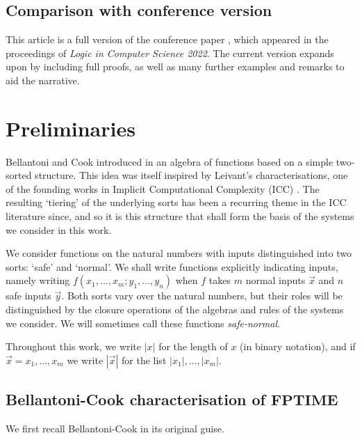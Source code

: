 \documentclass[manuscript,screen]{acmart}
\theoremstyle{definition}
\theoremstyle{remark}
\newcommand{\ptime}{\mathbf{PTIME}}
\newcommand{\f}{\mathbf{F}}
\newcommand{\fptime}{\f\ptime}
\begin{document}
\subsection*{Comparison with conference version}
This article is a full version of the conference paper \cite{CurziDas:lics22}, which appeared in the proceedings of \emph{Logic in Computer Science 2022}. 
The current version expands upon \cite{CurziDas:lics22} by including full proofs, as well as many further examples and remarks to aid the narrative.\section{Preliminaries}\label{sec:preliminaries}

Bellantoni and Cook introduced in \cite{BellantoniCook} an algebra of functions based on a simple two-sorted structure. This idea was itself inspired by Leivant's characterisations, one of the founding works in Implicit Computational Complexity (ICC) \cite{Leivant91}.
The resulting `tiering' of the underlying sorts has been a recurring theme in the ICC literature since, and so it is this structure that shall form the basis of the systems we consider in this work.

We consider functions on the natural numbers with inputs distinguished into two sorts: `safe' and `normal'.
We shall write functions explicitly indicating inputs, namely writing $f(x_1, \dots, x_{m}; y_1, \dots, y_{n})$ when $f$ takes $m$ normal inputs $\vec x$ and $n$ safe inputs $\vec y$.
Both sorts vary over the natural numbers, but their roles will be distinguished by the closure operations of the algebras and rules of the systems we consider. We will sometimes call these functions \emph{safe-normal}.

Throughout this work, we write $|x|$ for the length of $x$ (in binary notation), and if $\vec x = x_1, \dots, x_m$ we write $|\vec x|$ for the list $|x_1|,\dots, |x_m|$.


\subsection{Bellantoni-Cook characterisation of $\fptime$}
We first recall Bellantoni-Cook in its original guise.
\end{document}
